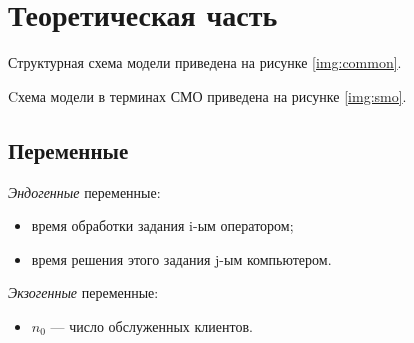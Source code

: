\chapter{Теоретическая часть}

Структурная схема модели приведена на рисунке \ref{img:common}.

Cхема модели в терминах СМО приведена на рисунке \ref{img:smo}.

\section{Переменные}

\textit{Эндогенные} переменные:
\begin{itemize}[label = ---]
	\item время обработки задания i-ым оператором; 
	\item время решения этого задания j-ым компьютером.
\end{itemize}

\textit{Экзогенные} переменные:
\begin{itemize}[label = ---]
	\item $n_0$ --- число обслуженных клиентов.
\end{itemize}
